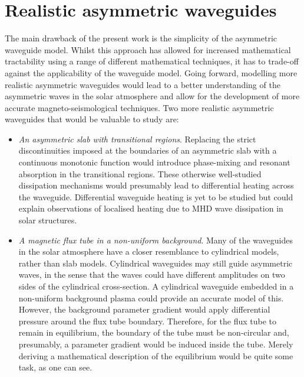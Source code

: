 \section{Realistic asymmetric waveguides}
The main drawback of the present work is the simplicity of the asymmetric waveguide model. Whilst this approach has allowed for increased mathematical tractability using a range of different mathematical techniques, it has to trade-off against the applicability of the waveguide model. Going forward, modelling more realistic asymmetric waveguides would lead to a better understanding of the asymmetric waves in the solar atmosphere and allow for the development of more accurate magneto-seismological techniques. Two more realistic asymmetric waveguides that would be valuable to study are:
\begin{itemize}
	\item \textit{An asymmetric slab with transitional regions}. Replacing the strict discontinuities imposed at the boundaries of an asymmetric slab with a continuous monotonic function would introduce phase-mixing and resonant absorption in the transitional regions. These otherwise well-studied dissipation mechanisms would presumably lead to differential heating across the waveguide. Differential waveguide heating is yet to be studied but could explain observations of localised heating due to MHD wave dissipation in solar structures.
	\item \textit{A magnetic flux tube in a non-uniform background}. Many of the waveguides in the solar atmosphere have a closer resemblance to cylindrical models, rather than slab models. Cylindrical waveguides may still guide asymmetric waves, in the sense that the waves could have different amplitudes on two sides of the cylindrical cross-section. A cylindrical waveguide embedded in a non-uniform background plasma could provide an accurate model of this. However, the background parameter gradient would apply differential pressure around the flux tube boundary. Therefore, for the flux tube to remain in equilibrium, the boundary of the tube must be non-circular and, presumably, a parameter gradient would be induced inside the tube. Merely deriving a mathematical description of the equilibrium would be quite some task, as one can see.
\end{itemize}


%
%
